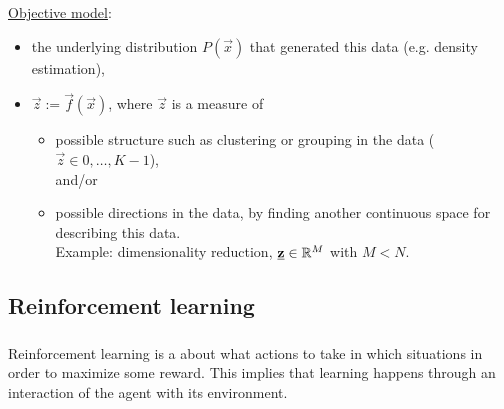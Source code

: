 \begin{frame}

\underline{Objective model}:
\begin{itemize}
\item the underlying distribution $P(\vec x)$ that generated this data (e.g. density estimation),
\item $\vec z := \vec f(\vec x)$, where $\vec z$ is a measure of 
\begin{itemize}
\item possible structure such as clustering or grouping in the data ($\vec z \in {0,\ldots,K-1}$), \\

and/or

\item possible directions in the data, by finding another continuous space for describing this data. \\

Example: dimensionality reduction, $\underline{\mathbf{z}} \in \mathbb{R}^M$ with $M < N$.

\end{itemize}
\end{itemize}

\end{frame}

\newpage

\subsection{Reinforcement learning} \label{sec:reinforcement}

\begin{frame}\frametitle{\subsecname}

Reinforcement learning is a about what actions to take in which situations in order to maximize some reward.
This implies that learning happens through an interaction of the agent with its environment.

\end{frame}

